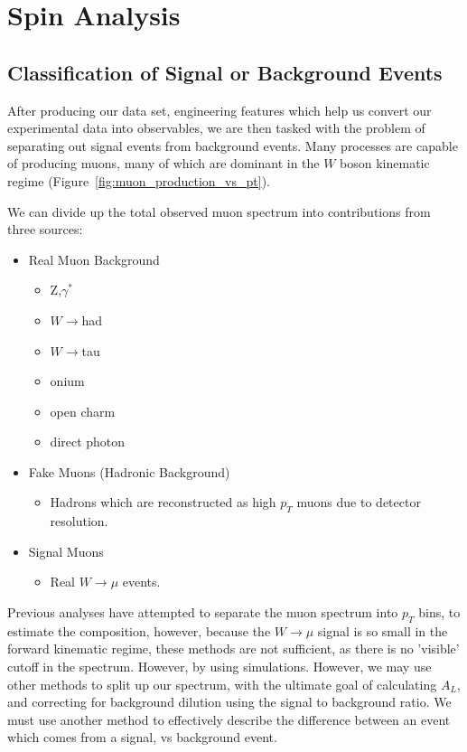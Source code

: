 \chapter{Spin Analysis}
\section{Classification of Signal or Background Events}
After producing our data set, engineering features which help us convert our
experimental data into observables, we are then tasked with the problem of
separating out signal events from background events. Many processes are capable
of producing muons, many of which are dominant in the $W$ boson kinematic
regime (Figure~\ref{fig:muon_production_vs_pt}).

We can divide up the total observed muon spectrum into contributions from three
sources:

\begin{itemize}
	\item Real Muon Background
		\begin{itemize}
			\item Z,$\gamma^*$
			\item $W\rightarrow$had
			\item $W\rightarrow$tau
		  \item onium
			\item open charm
			\item direct photon
		\end{itemize}
	\item Fake Muons (Hadronic Background)
		\begin{itemize}	
			\item Hadrons which are reconstructed as high $p_T$ muons due to detector
			resolution.
		\end{itemize}
	\item Signal Muons
		\begin{itemize}	
			\item Real $W\rightarrow\mu$ events.
		\end{itemize}
\end{itemize}

Previous analyses have attempted to separate the muon spectrum into $p_T$ bins,
to estimate the composition, however, because the $W\rightarrow\mu$ signal is so
small in the forward kinematic regime, these methods are not sufficient, as
there is no 'visible' cutoff in the spectrum. However, by using simulations.
However, we may use other methods to split up our spectrum, with the ultimate
goal of calculating $A_L$, and correcting for background dilution using the
signal to background ratio. We must use another method to effectively describe
the difference between an event which comes from a signal, vs background event.

